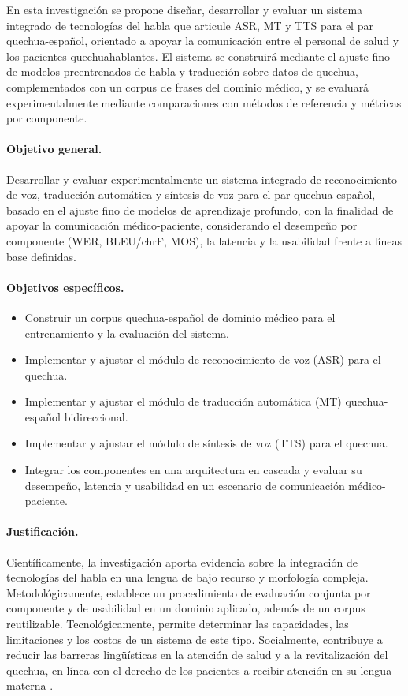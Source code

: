 En esta investigación se propone diseñar, desarrollar y evaluar un sistema
integrado de tecnologías del habla que articule ASR, MT y TTS para el par
quechua-español, orientado a apoyar la comunicación entre el personal de salud y
los pacientes quechuahablantes. El sistema se construirá mediante el ajuste fino
de modelos preentrenados de habla y traducción sobre datos de quechua,
complementados con un corpus de frases del dominio médico, y se evaluará
experimentalmente mediante comparaciones con métodos de referencia y métricas
por componente.

\paragraph{Objetivo general.}
Desarrollar y evaluar experimentalmente un sistema integrado de reconocimiento
de voz, traducción automática y síntesis de voz para el par quechua-español,
basado en el ajuste fino de modelos de aprendizaje profundo, con la finalidad de
apoyar la comunicación médico-paciente, considerando el desempeño por componente
(WER, BLEU/chrF, MOS), la latencia y la usabilidad frente a líneas base
definidas.

\paragraph{Objetivos específicos.}
\begin{itemize}
  \item Construir un corpus quechua-español de dominio médico para el
        entrenamiento y la evaluación del sistema.
  \item Implementar y ajustar el módulo de reconocimiento de voz (ASR) para el
        quechua.
  \item Implementar y ajustar el módulo de traducción automática (MT)
        quechua-español bidireccional.
  \item Implementar y ajustar el módulo de síntesis de voz (TTS) para el quechua.
  \item Integrar los componentes en una arquitectura en cascada y evaluar su
        desempeño, latencia y usabilidad en un escenario de comunicación
        médico-paciente.
\end{itemize}

\paragraph{Justificación.}
Científicamente, la investigación aporta evidencia sobre la integración de
tecnologías del habla en una lengua de bajo recurso y morfología compleja.
Metodológicamente, establece un procedimiento de evaluación conjunta por
componente y de usabilidad en un dominio aplicado, además de un corpus
reutilizable. Tecnológicamente, permite determinar las capacidades, las
limitaciones y los costos de un sistema de este tipo. Socialmente, contribuye a
reducir las barreras lingüísticas en la atención de salud y a la revitalización
del quechua, en línea con el derecho de los pacientes a recibir atención en su
lengua materna \parencite{essalud2023}.

